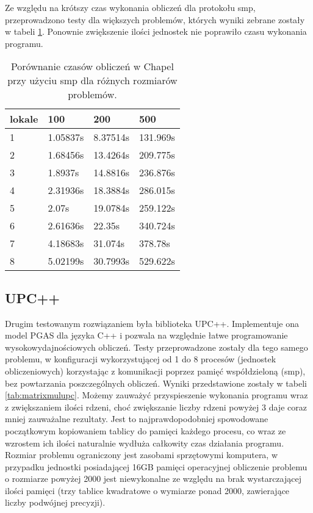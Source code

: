     Ze względu na krótszy czas wykonania obliczeń dla protokołu smp, przeprowadzono testy dla większych problemów, których wyniki zebrane zostały w tabeli \ref{tab:matrixmulchapelsmp}.
    Ponownie zwiększenie ilości jednostek nie poprawiło czasu wykonania programu.
    
    \begin{table}[]
    \centering
    \begin{tabular}{l|l|l|l}
    \textbf{lokale} & \textbf{100} & \textbf{200} & \textbf{500} \\ \hline
    1               & 1.05837s     & 8.37514s     & 131.969s     \\
    2               & 1.68456s     & 13.4264s     & 209.775s     \\
    3               & 1.8937s      & 14.8816s     & 236.876s     \\
    4               & 2.31936s     & 18.3884s     & 286.015s     \\
    5               & 2.07s        & 19.0784s     & 259.122s     \\
    6               & 2.61636s     & 22.35s       & 340.724s     \\
    7               & 4.18683s     & 31.074s      & 378.78s      \\
    8               & 5.02199s     & 30.7993s     & 529.622s    
    \end{tabular}
    \caption{Porównanie czasów obliczeń w Chapel przy użyciu smp dla różnych rozmiarów problemów.}
    \label{tab:matrixmulchapelsmp}
    \end{table}
    
    \subsection{UPC++}
    Drugim testowanym rozwiązaniem była biblioteka UPC++.
    Implementuje ona model PGAS dla języka C++ i pozwala na względnie łatwe programowanie wysokowydajnościowych obliczeń.
    Testy przeprowadzone zostały dla tego samego problemu, w konfiguracji wykorzystującej od 1 do 8 procesów (jednostek obliczeniowych) korzystając z komunikacji poprzez pamięć współdzieloną (smp), bez powtarzania poszczególnych obliczeń.
    Wyniki przedstawione zostały w tabeli \ref{tab:matrixmulupc}.
    Możemy zauważyć przyspieszenie wykonania programu wraz z zwiększaniem ilości rdzeni, choć zwiększanie liczby rdzeni powyżej 3 daje coraz mniej zauważalne rezultaty.
    Jest to najprawdopodobniej spowodowane początkowym kopiowaniem tablicy do pamięci każdego procesu, co wraz ze wzrostem ich ilości naturalnie wydłuża całkowity czas działania programu.
    Rozmiar problemu ograniczony jest zasobami sprzętowymi komputera, w przypadku jednostki posiadającej 16GB pamięci operacyjnej obliczenie problemu o rozmiarze powyżej 2000 jest niewykonalne ze względu na brak wystarczającej ilości pamięci (trzy tablice kwadratowe o wymiarze ponad 2000, zawierające liczby podwójnej precyzji).
    
